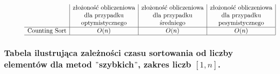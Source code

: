 \documentclass[polish,polish,a4paper]{article}
\begin{document}
\begin{spacing}{1.5}
\begin{figure}[H]
	\begin{equation*}
	\begin{array}{l|c|c|c|}

	&$złożoność obliczeniowa$&$złożoność obliczeniowa$&$złożoność obliczeniowa$\\
	&$dla przypadku$&$dla przypadku$&$dla przypadku$\\
	&$optymistycznego$&$średniego$&$pesymistycznego$\\
	\hline
	$Counting Sort$&O(n)&O(n)&O(n)\\
	\hline
	\end{array}
	\end{equation*}
\end{figure}

	\subsubsection*{Tabela ilustrująca zależności czasu sortowania od liczby elementów dla metod $"$szybkich$"$, zakres liczb $ [1,n] $.}


\end{spacing}
\end{document}
